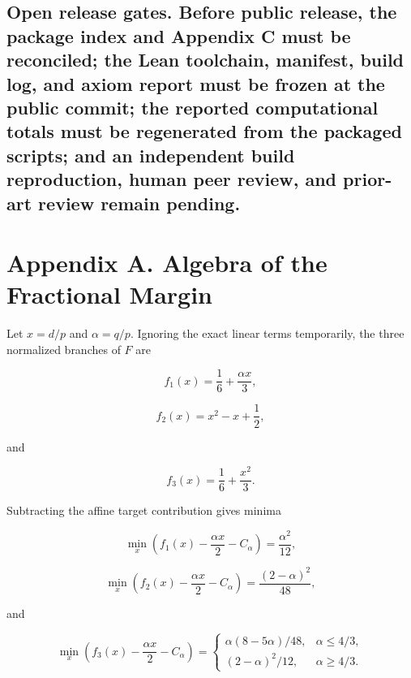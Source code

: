 \documentclass[
  11pt,
]{article}
\begin{document}
\subsection{\texorpdfstring{\textbf{Open release gates.} Before public
release, the package index and Appendix C must be reconciled; the Lean
toolchain, manifest, build log, and axiom report must be frozen at the
public commit; the reported computational totals must be regenerated
from the packaged scripts; and an independent build reproduction, human
peer review, and prior-art review remain
pending.}{Open release gates. Before public release, the package index and Appendix C must be reconciled; the Lean toolchain, manifest, build log, and axiom report must be frozen at the public commit; the reported computational totals must be regenerated from the packaged scripts; and an independent build reproduction, human peer review, and prior-art review remain pending.}}\label{open-release-gates.-before-public-release-the-package-index-and-appendix-c-must-be-reconciled-the-lean-toolchain-manifest-build-log-and-axiom-report-must-be-frozen-at-the-public-commit-the-reported-computational-totals-must-be-regenerated-from-the-packaged-scripts-and-an-independent-build-reproduction-human-peer-review-and-prior-art-review-remain-pending.}

\section{Appendix A. Algebra of the Fractional
Margin}\label{appendix-a.-algebra-of-the-fractional-margin}

Let \(x=d/p\) and \(\alpha=q/p\). Ignoring the exact linear terms
temporarily, the three normalized branches of \(F\) are

\[
f_1(x)=\frac16+\frac{\alpha x}{3},
\]

\[
f_2(x)=x^2-x+\frac12,
\]

and

\[
f_3(x)=\frac16+\frac{x^2}{3}.
\]

Subtracting the affine target contribution gives minima

\[
\min_x\left(f_1(x)-\frac{\alpha x}{2}-C_\alpha\right)
=
\frac{\alpha^2}{12},
\]

\[
\min_x\left(f_2(x)-\frac{\alpha x}{2}-C_\alpha\right)
=
\frac{(2-\alpha)^2}{48},
\]

and

\[
\min_x\left(f_3(x)-\frac{\alpha x}{2}-C_\alpha\right)
=
\begin{cases}
\alpha(8-5\alpha)/48,&\alpha\le4/3,\\
(2-\alpha)^2/12,&\alpha\ge4/3.
\end{cases}
\]
\end{document}
